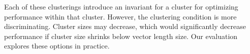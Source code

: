 Each of these clusterings introduce an invariant for a cluster for optimizing performance within that cluster. However, the clustering condition is more discriminating.  Cluster sizes may decrease, which would  significantly decrease  performance if cluster size shrinks below vector length size. Our evaluation explores these options in practice.
